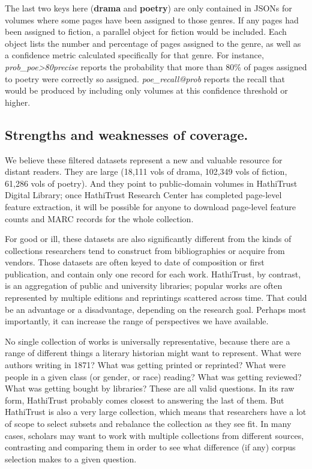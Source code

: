 \documentclass[paper=a4, fontsize=12pt]{scrartcl}
\numberwithin{equation}{section}		%
\numberwithin{figure}{section}			%
\numberwithin{table}{section}				%
\begin{document}
\vspace{2mm}
\noindent The last two keys here (\textbf{drama} and \textbf{poetry}) are only contained in JSONs for volumes where some pages have been assigned to those genres. If any pages had been assigned to fiction, a parallel object for fiction would be included. Each object lists the number and percentage of pages assigned to the genre, as well as a confidence metric calculated specifically for that genre. For instance, \textit{prob\_poe>80precise} reports the probability that more than 80\% of pages assigned to poetry were correctly so assigned. \textit{poe\_recall@prob} reports the recall that would be produced by including only volumes at this confidence threshold or higher.

\FloatBarrier


\subsection{Strengths and weaknesses of coverage.}

We believe these filtered datasets represent a new and valuable resource for distant readers. They are large (18,111 vols of drama, 102,349 vols of fiction, 61,286 vols of poetry). And they point to public-domain volumes in HathiTrust Digital Library; once HathiTrust Research Center has completed page-level feature extraction, it will be possible for anyone to download page-level feature counts and MARC records for the whole collection.

For good or ill, these datasets are also significantly different from the kinds of collections researchers tend to construct from bibliographies or acquire from vendors. Those datasets are often keyed to date of composition or first publication, and contain only one record for each work. HathiTrust, by contrast, is an aggregation of public and university libraries; popular works are often represented by multiple editions and reprintings scattered across time. That could be an advantage or a disadvantage, depending on the research goal. Perhaps most importantly, it can increase the range of perspectives we have available.

No single collection of works is universally representative, because there are a range of different things a literary historian might want to represent. What were authors writing in 1871? What was getting printed or reprinted? What were people in a given class (or gender, or race) reading? What was getting reviewed? What was getting bought by libraries? These are all valid questions. In its raw form, HathiTrust probably comes closest to answering the last of them. But HathiTrust is also a very large collection, which means that researchers have a lot of scope to select subsets and rebalance the collection as they see fit. In many cases, scholars may want to work with multiple collections from different sources, contrasting and comparing them in order to see what difference (if any) corpus selection makes to a given question. 
\end{document}

